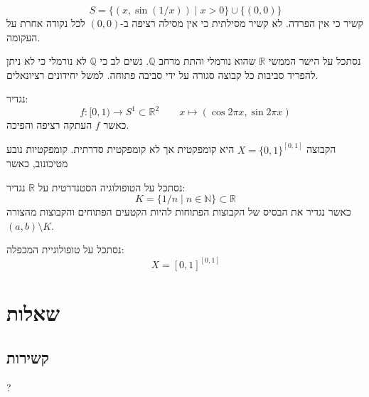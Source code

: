 \documentclass{tstextbook}
\begin{document}
\begin{example}
$$S=\{(x,\sin(1/x))\mid x>0\}\cup\{(0,0)\}$$
קשיר כי אין הפרדה. לא קשיר מסילתית כי אין מסילה רציפה ב-\((0,0)\) לכל נקודה אחרת על העקומה.

\end{example}
\begin{example}
נסתכל על הישר הממשי \(\mathbb{R}\) שהוא נורמלי והתת מרחב \(\mathbb{Q}\). נשים לב כי \(\mathbb{Q}\) לא נורמלי כי לא ניתן להפריד סביבות כל קבוצה סגורה על ידי סביבה פתוחה. למשל יחידונים רציונאלים.

\end{example}
\begin{example}
נגדיר:
$$f: [0,1) \to S^1 \subset \mathbb{R}^2\qquad x\mapsto\left( \cos 2\pi x,\sin 2\pi x \right)$$
כאשר \(f\) העתקה רציפה והפיכה.

\end{example}
\begin{example}
הקבוצה \(X=\{ 0,1 \}^{[0,1]}\) היא קומפקטית אך לא קומפקטית סדרתית. קומפקטיות נובע מטיכונוב, כאשר 

\end{example}
\begin{example}
נסתכל על הטופולוגיה הסטנדרטית על \(\mathbb{R}\) נגדיר:
$$K = \{1/n \mid n\in\mathbb{N}\} \subset \mathbb{R}$$
כאשר נגדיר את הבסיס של הקבוצות הפתוחות להיות הקטעים הפתוחים והקבוצות מהצורה \((a,b)\setminus K\).

\end{example}
\begin{example}
נסתכל על טופולוגיית המכפלה:
$$X=[0,1]^{[0,1]}$$

\end{example}
\chapter{שאלות}

\section{קשירות}

?
\end{document}
